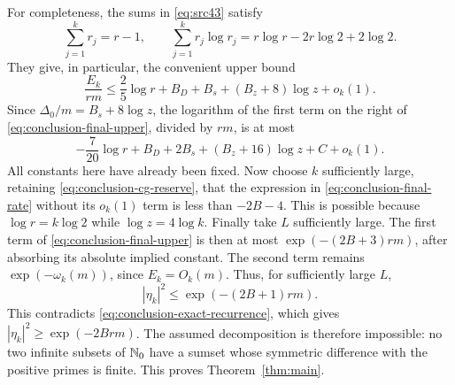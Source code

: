 For completeness, the sums in \eqref{eq:src43} satisfy
\[
 \sum_{j=1}^k r_j=r-1,
 \qquad
 \sum_{j=1}^k r_j\log r_j
   =r\log r-2r\log2+2\log2.
\]
They give, in particular, the convenient upper bound
\begin{equation}\label{eq:conclusion-frequency-budget}
 \frac{E_k}{rm}
 \le\frac25\log r+B_D+B_s+(B_z+8)\log z+o_k(1).
\end{equation}
Since $\Delta_0/m=B_s+8\log z$, the logarithm of the first term on the
right of \eqref{eq:conclusion-final-upper}, divided by $rm$, is at most
\begin{equation}\label{eq:conclusion-final-rate}
 -\frac7{20}\log r+B_D+2B_s+(B_z+16)\log z+C+o_k(1).
\end{equation}
All constants here have already been fixed.  Now choose $k$ sufficiently
large, retaining \eqref{eq:conclusion-cg-reserve}, that the expression
in \eqref{eq:conclusion-final-rate} without its $o_k(1)$ term is less
than $-2B-4$.  This is possible because $\log r=k\log2$ while
$\log z=4\log k$.  Finally take $L$ sufficiently large.  The first
term of \eqref{eq:conclusion-final-upper} is then at most
$\exp(-(2B+3)rm)$, after absorbing its absolute implied constant.
The second term remains $\exp(-\omega_k(m))$, since $E_k=O_k(m)$.
Thus, for sufficiently large $L$,
\[
 |\eta_k|^2\le\exp(-(2B+1)rm).
\]
This contradicts \eqref{eq:conclusion-exact-recurrence}, which gives
$|\eta_k|^2\ge\exp(-2Brm)$.  The assumed decomposition is therefore
impossible: no two infinite subsets of $\mathbb N_0$ have a sumset whose
symmetric difference with the positive primes is finite.  This proves
Theorem~\ref{thm:main}.

